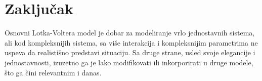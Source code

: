 \documentclass[a4paper]{article}
\begin{document}
\section{Zaključak}
\label{sec:zakljucak}

Osnovni Lotka-Voltera model je dobar za modeliranje vrlo jednostavnih sistema,
ali kod kompleksnijih sistema, sa više interakcija i kompleksnijim parametrima ne uspeva
da realistišno predstavi situaciju. Sa druge strane, usled svoje elegancije i jednostavnosti,
izuzetno ga je lako modifikovati ili inkorporirati u druge modele, što ga čini relevantnim i danas.
\end{document}
